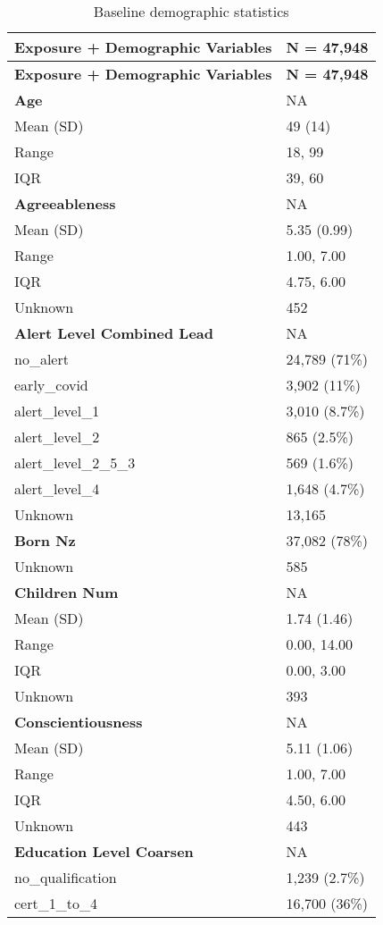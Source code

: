 \documentclass[
  singlecolumn]{article}
\begin{document}
\begin{longtable}[]{@{}ll@{}}
\caption{Baseline demographic
statistics}\label{tbl-table-demography}\tabularnewline
\toprule\noalign{}
\textbf{Exposure + Demographic Variables} & \textbf{N = 47,948} \\
\midrule\noalign{}
\endfirsthead
\toprule\noalign{}
\textbf{Exposure + Demographic Variables} & \textbf{N = 47,948} \\
\midrule\noalign{}
\endhead
\bottomrule\noalign{}
\endlastfoot
\textbf{Age} & NA \\
Mean (SD) & 49 (14) \\
Range & 18, 99 \\
IQR & 39, 60 \\
\textbf{Agreeableness} & NA \\
Mean (SD) & 5.35 (0.99) \\
Range & 1.00, 7.00 \\
IQR & 4.75, 6.00 \\
Unknown & 452 \\
\textbf{Alert Level Combined Lead} & NA \\
no\_alert & 24,789 (71\%) \\
early\_covid & 3,902 (11\%) \\
alert\_level\_1 & 3,010 (8.7\%) \\
alert\_level\_2 & 865 (2.5\%) \\
alert\_level\_2\_5\_3 & 569 (1.6\%) \\
alert\_level\_4 & 1,648 (4.7\%) \\
Unknown & 13,165 \\
\textbf{Born Nz} & 37,082 (78\%) \\
Unknown & 585 \\
\textbf{Children Num} & NA \\
Mean (SD) & 1.74 (1.46) \\
Range & 0.00, 14.00 \\
IQR & 0.00, 3.00 \\
Unknown & 393 \\
\textbf{Conscientiousness} & NA \\
Mean (SD) & 5.11 (1.06) \\
Range & 1.00, 7.00 \\
IQR & 4.50, 6.00 \\
Unknown & 443 \\
\textbf{Education Level Coarsen} & NA \\
no\_qualification & 1,239 (2.7\%) \\
cert\_1\_to\_4 & 16,700 (36\%) \\

\end{longtable}
\end{document}
